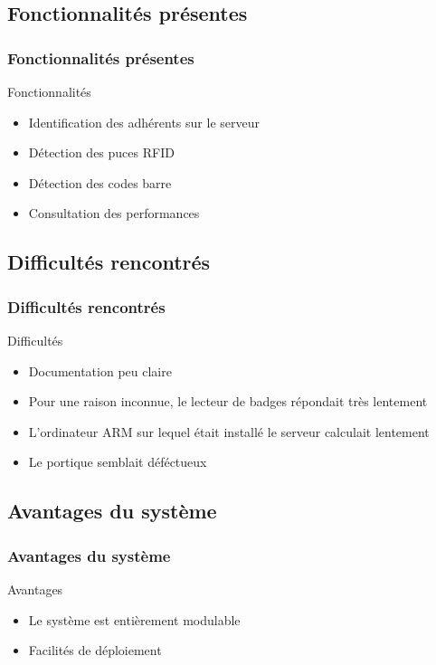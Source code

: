 \documentclass[10pt,handout,usepdftitle=false,envcountsect]{beamer}
\begin{document}
\subsection{Fonctionnalités présentes}
\begin{frame}
\frametitle{Fonctionnalités présentes}
\begin{block}{Fonctionnalités}
    \begin{itemize}
        \item Identification des adhérents sur le serveur
        \item Détection des puces RFID
        \item Détection des codes barre
        \item Consultation des performances
    \end{itemize}
\end{block}
\end{frame}

\begin{frame}
\subsection{Difficultés rencontrés}
\frametitle{Difficultés rencontrés}
\begin{block}{Difficultés}
    \begin{itemize}
            \item Documentation peu claire
            \item Pour une raison inconnue, le lecteur de badges répondait très lentement
            \item L'ordinateur ARM sur lequel était installé le serveur calculait lentement
            \item Le portique semblait déféctueux
    \end{itemize}
\end{block}
\end{frame}

\begin{frame}
\subsection{Avantages du système}
\frametitle{Avantages du système}
\begin{block}{Avantages}
    \begin{itemize}
        \item Le système est entièrement modulable
        \item Facilités de déploiement
    \end{itemize}
\end{block}
\end{frame}
\end{document}

